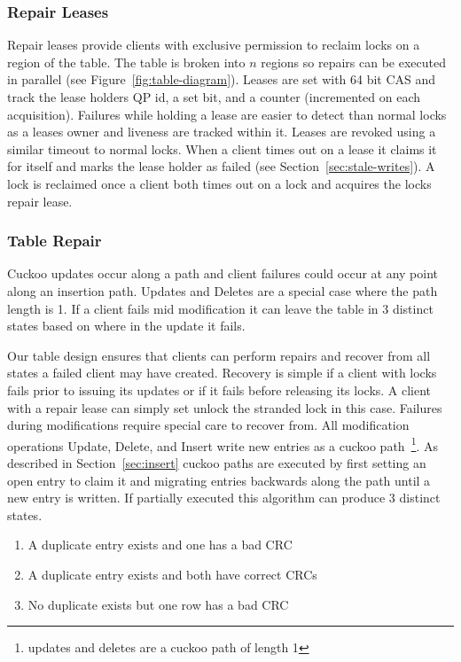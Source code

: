 \subsubsection{Repair Leases}

Repair leases provide clients with exclusive permission to
reclaim locks on a region of the table. The table is broken
into $n$ regions so repairs can be executed in parallel (see
Figure~\ref{fig:table-diagram}). Leases are set with 64 bit
CAS and track the lease holders QP id, a set bit, and a
counter (incremented on each acquisition).  Failures while
holding a lease are easier to detect than normal locks as a
leases owner and liveness are tracked within it.  Leases are
revoked using a similar timeout to normal locks. When a
client times out on a lease it claims it for itself and
marks the lease holder as failed (see
Section~\ref{sec:stale-writes}).  A lock is reclaimed once a
client both times out on a lock and acquires the locks
repair lease. 


\subsubsection{Table Repair} 
\label{sec:table-repair}

Cuckoo updates occur along a path
and client failures could occur at any point along an
insertion path. Updates and Deletes are a special case where
the path length is 1. If a client fails mid modification it
can leave the table in 3 distinct states based on where in
the update it fails. 

Our table design ensures that clients can perform repairs
and recover from all states a failed client may have
created. Recovery is simple if a client with locks fails
prior to issuing its updates or if it fails before releasing
its locks. A client with a repair lease can simply set
unlock the stranded lock in this case. Failures during
modifications require special care to recover from. All
modification operations Update, Delete, and Insert write new
entries as a cuckoo path~\footnote{updates and deletes are a
cuckoo path of length 1}. As described in
Section~\ref{sec:insert} cuckoo paths are executed by first
setting an open entry to claim it and migrating entries
backwards along the path until a new entry is written. If
partially executed this algorithm can produce 3 distinct
states.

\begin{enumerate}
    \item{A duplicate entry exists and one has a bad CRC}
    \item{A duplicate entry exists and both have correct CRCs} 
    \item{No duplicate exists but one row has a bad CRC}
\end{enumerate}


